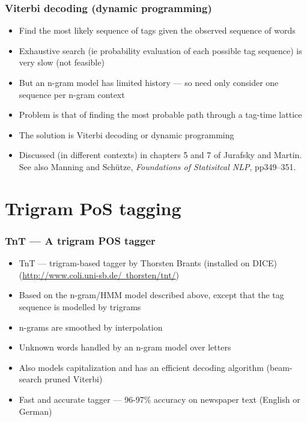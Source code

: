 \begin{frame}
  \frametitle{Viterbi decoding (dynamic programming)}
  \begin{itemize}
  \item<1-> Find the most likely sequence of tags given the observed
    sequence of words
  \item<1-> Exhaustive search (ie probability evaluation of each possible
    tag sequence) is very slow (not feasible)
  \item<2-> But an n-gram model has limited history --- so need only
    consider one sequence per n-gram context
  \item<2-> Problem is that of finding the most probable path through a
    tag-time lattice
  \item<3-> The solution is \alert{Viterbi decoding} or \alert{dynamic
      programming} 
  \item<3-> Discussed (in different contexts) in chapters 5 and 7 of
    Jurafsky and Martin.  See also Manning and Sch\"utze,
    \emph{Foundations of Statisitcal NLP}, pp349--351.
  \end{itemize}
\end{frame}

\section{Trigram PoS tagging}

\begin{frame}
  \frametitle{TnT --- A trigram POS tagger}
  \begin{itemize}
  \item<1-> TnT --- trigram-based tagger by Thorsten Brants (installed on
    DICE)
    (\href{http://www.coli.uni-sb.de/~thorsten/tnt/}{http://www.coli.uni-sb.de/~thorsten/tnt/})
  \item<1-> Based on the n-gram/HMM model described above, except that the
    tag sequence is modelled by trigrams
  \item<2-> n-grams are smoothed by interpolation
  \item<3-> Unknown words handled by an n-gram model over letters
  \item<4-> Also models capitalization and has an efficient decoding
    algorithm (beam-search pruned Viterbi)
  \item<5-> Fast and accurate tagger --- 96-97\% accuracy on newspaper
    text (English or German)
  \end{itemize}
\end{frame}


